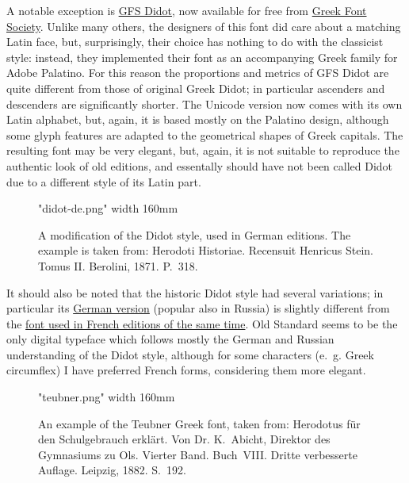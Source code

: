 \documentclass[12pt,a4paper,openany]{book}
\begin{document}
A notable exception is
\href{http://www.greekfontsociety.org/pages/en\_typefaces.html}{GFS Didot},
now available for free from \href{http://www.greekfontsociety.gr/}{Greek
Font Society}. Unlike many others, the designers of this font did care about
a matching Latin face, but, surprisingly, their choice has nothing to do
with the classicist style: instead, they implemented their font as an
accompanying Greek family for Adobe Palatino. For this reason the proportions
and metrics of GFS Didot are quite different from those of original Greek
Didot; in particular ascenders and descenders are significantly shorter.
The Unicode version now comes with its own Latin alphabet, but, again, it
is based mostly on the Palatino design, although some glyph features are
adapted to the geometrical shapes of Greek capitals. The resulting font
may be very elegant, but, again, it is not suitable to reproduce the authentic
look of old editions, and essentally should have not been called Didot
due to a different style of its Latin part.

\begin{figure}[htb]

\centerline{\XeTeXpicfile "didot-de.png" width 160mm}

\caption{A modification of the Didot style, used in German editions. The
example is taken from: Herodoti Historiae. Recensuit Henricus Stein. Tomus
II. Berolini, 1871. P.~318.}

\hypertarget{fig:didot-de}{}\label{fig:didot-de}

\end{figure}

It should also be noted that the historic Didot style had several variations;
in particular its \hyperlink{fig:didot-de}{German version} (popular also in
Russia) is slightly different from the \hyperlink{fig:didot-fr}{font used in 
French editions of the same time}. Old Standard seems to be the only digital
typeface which follows mostly the German and Russian understanding of the
Didot style, although for some characters (e.~g. Greek circumflex) I have 
preferred French forms, considering them more elegant.

\begin{figure}[htb]

\centerline{\XeTeXpicfile "teubner.png" width 160mm}

\caption{An example of the Teubner Greek font, taken from: Herodotus für
den Schulgebrauch erklärt. Von Dr. K.~Abicht, Direktor des Gymnasiums zu
Ols. Vierter Band. Buch~VIII. Dritte verbesserte Auflage. Leipzig, 1882.
S.~192.}

\hypertarget{fig:teubner}{}\label{fig:teubner}

\end{figure}
\end{document}
